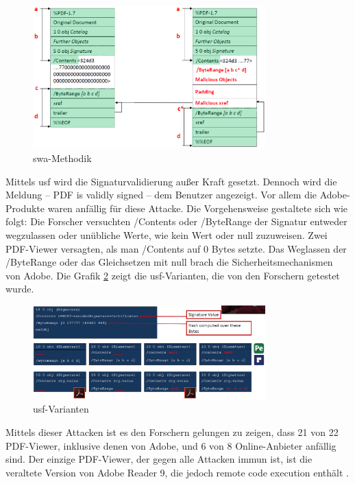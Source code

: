 \begin{figure}[!htbp]
	\centering
	\includegraphics[width=0.8\textwidth]{"images/sig_wrap_attack.png"}
	\caption{\gls{swa}-Methodik \cite{ccc-break-pdf-slides}}
	\label{fig:swa}
\end{figure}

Mittels \gls{usf} wird die Signaturvalidierung außer Kraft gesetzt. Dennoch wird die Meldung – PDF is validly signed – dem Benutzer angezeigt. Vor allem die Adobe-Produkte waren anfällig für diese Attacke. Die Vorgehensweise gestaltete sich wie folgt: Die Forscher versuchten /Contents oder /ByteRange der Signatur entweder wegzulassen oder unübliche Werte, wie kein Wert oder null zuzuweisen. Zwei PDF-Viewer versagten, als man /Contents auf 0 Bytes setzte. Das Weglassen der /ByteRange oder das Gleichsetzen mit null brach die Sicherheitsmechanismen von Adobe. Die Grafik \ref{fig:usf} zeigt die \gls{usf}-Varianten, die von den Forschern getestet wurde.

\begin{figure}[!htbp]
	\centering
	\includegraphics[width=0.8\textwidth]{"images/univ_sig_forgery.png"}
	\caption{\gls{usf}-Varianten \cite{ccc-break-pdf-slides}}
	\label{fig:usf}
\end{figure}

Mittels dieser Attacken ist es den Forschern gelungen zu zeigen, dass 21 von 22 PDF-Viewer, inklusive denen von Adobe, und 6 von 8 Online-Anbieter anfällig sind. Der einzige PDF-Viewer, der gegen alle Attacken immun ist, ist die veraltete Version von Adobe Reader 9, die jedoch remote code execution enthält \cite{ccc-break-pdf}. 